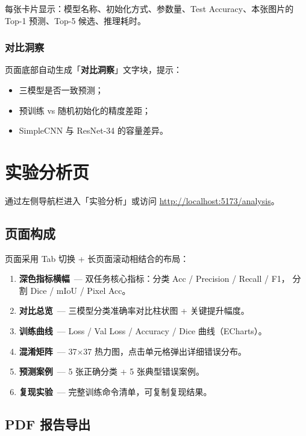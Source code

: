 \documentclass[12pt, a4paper, openany]{ctexbook}
\begin{document}
每张卡片显示：模型名称、初始化方式、参数量、Test Accuracy、本张图片的 Top-1 预测、Top-5 候选、推理耗时。

\subsection{对比洞察}

页面底部自动生成「\textbf{对比洞察}」文字块，提示：

\begin{itemize}
  \item 三模型是否一致预测；
  \item 预训练 vs 随机初始化的精度差距；
  \item SimpleCNN 与 ResNet-34 的容量差异。
\end{itemize}

\chapter{实验分析页}

通过左侧导航栏进入「实验分析」或访问 \url{http://localhost:5173/analysis}。

\section{页面构成}

页面采用 Tab 切换 + 长页面滚动相结合的布局：

\begin{enumerate}[leftmargin=*]
  \item \textbf{深色指标横幅}\ — 双任务核心指标：分类 Acc / Precision / Recall / F1，
        分割 Dice / mIoU / Pixel Acc。
  \item \textbf{对比总览}\ — 三模型分类准确率对比柱状图 + 关键提升幅度。
  \item \textbf{训练曲线}\ — Loss / Val Loss / Accuracy / Dice 曲线（ECharts）。
  \item \textbf{混淆矩阵}\ — 37×37 热力图，点击单元格弹出详细错误分布。
  \item \textbf{预测案例}\ — 5 张正确分类 + 5 张典型错误案例。
  \item \textbf{复现实验}\ — 完整训练命令清单，可复制复现结果。
\end{enumerate}

\section{PDF 报告导出}
\end{document}
